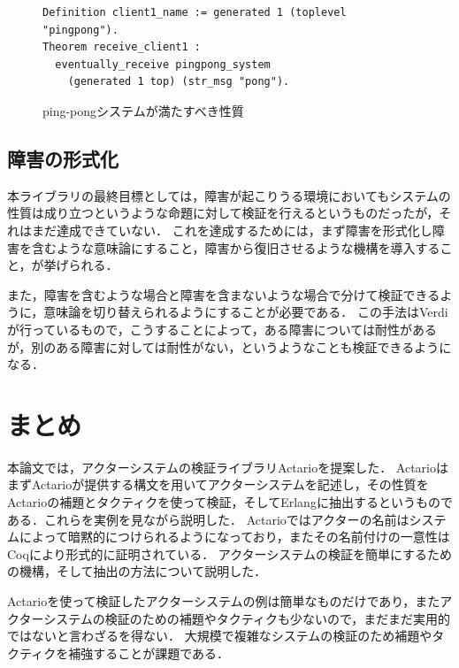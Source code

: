 \begin{figure}[tp]
\begin{lstlisting}
Definition client1_name := generated 1 (toplevel "pingpong").
Theorem receive_client1 :
  eventually_receive pingpong_system
    (generated 1 top) (str_msg "pong").
\end{lstlisting}
  \label{code:conclusion:pingpong-spec}
  \caption{ping-pongシステムが満たすべき性質}
\end{figure}

\subsection{障害の形式化}
本ライブラリの最終目標としては，障害が起こりうる環境においてもシステムの性質は成り立つというような命題に対して検証を行えるというものだったが，それはまだ達成できていない．
これを達成するためには，まず障害を形式化し障害を含むような意味論にすること，障害から復旧させるような機構を導入すること，が挙げられる．



また，障害を含むような場合と障害を含まないような場合で分けて検証できるように，意味論を切り替えられるようにすることが必要である．
この手法はVerdiが行っているもので，こうすることによって，ある障害については耐性があるが，別のある障害に対しては耐性がない，というようなことも検証できるようになる．


\section{まとめ}

本論文では，アクターシステムの検証ライブラリActarioを提案した．
ActarioはまずActarioが提供する構文を用いてアクターシステムを記述し，その性質をActarioの補題とタクティクを使って検証，そしてErlangに抽出するというものである．これらを実例を見ながら説明した．
Actarioではアクターの名前はシステムによって暗黙的につけられるようになっており，またその名前付けの一意性はCoqにより形式的に証明されている．
アクターシステムの検証を簡単にするための機構，そして抽出の方法について説明した．

Actarioを使って検証したアクターシステムの例は簡単なものだけであり，またアクターシステムの検証のための補題やタクティクも少ないので，まだまだ実用的ではないと言わざるを得ない．
大規模で複雑なシステムの検証のため補題やタクティクを補強することが課題である．
